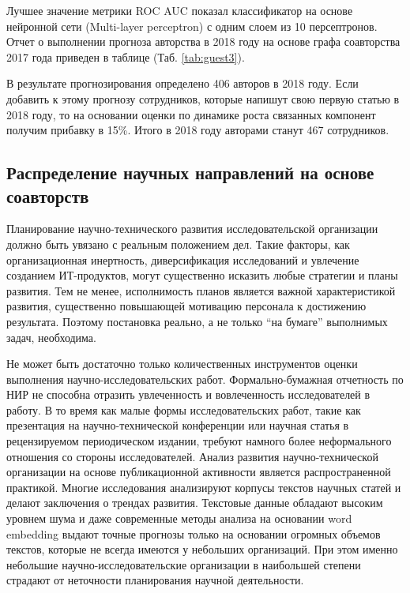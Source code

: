 Лучшее значение метрики ROC AUC показал классификатор на основе нейронной сети (Multi-layer perceptron) с одним слоем из 10 персептронов. 
Отчет о выполнении прогноза авторства в 2018 году на основе графа соавторства 2017 года приведен в таблице (Таб. \ref{tab:guest3}).

\begin{table}[H]
\centering
\caption{Отчет о выполнении прогноза авторства на 2018 г.}
\label{tab:guest3}
\end{table}

В результате прогнозирования определено 406 авторов в 2018 году. Если добавить к этому прогнозу сотрудников, которые напишут свою первую статью в 2018 году, то на основании оценки по динамике роста связанных компонент получим прибавку в 15\%. Итого в 2018 году авторами станут 467 сотрудников.

\subsection{Распределение научных направлений на основе соавторств}
\label{sec:allo}
Планирование научно-технического развития исследовательской организации должно быть увязано с реальным положением дел. Такие факторы, как организационная инертность, диверсификация исследований и увлечение созданием ИТ-продуктов, могут существенно исказить любые стратегии и планы развития. Тем не менее, исполнимость планов является важной характеристикой развития, существенно повышающей мотивацию персонала к достижению результата. Поэтому постановка реально, а не только ``на бумаге'' выполнимых задач, необходима. 

Не может быть достаточно только количественных инструментов оценки выполнения научно-исследовательских работ. Формально-бумажная отчетность по НИР не способна отразить увлеченность и вовлеченность исследователей в работу. В то время как малые формы исследовательских работ, такие как презентация на научно-технической конференции или научная статья в рецензируемом периодическом издании, требуют намного более неформального отношения со стороны исследователей.  Анализ развития научно-технической организации на основе публикационной активности является распространенной практикой. Многие исследования анализируют корпусы текстов научных статей и делают заключения о трендах развития. Текстовые данные обладают высоким уровнем шума и даже современные методы анализа на основании word embedding выдают точные прогнозы только на основании огромных объемов текстов, которые не всегда имеются у небольших организаций. При этом именно небольшие научно-исследовательские организации в наибольшей степени страдают от неточности планирования научной деятельности.

